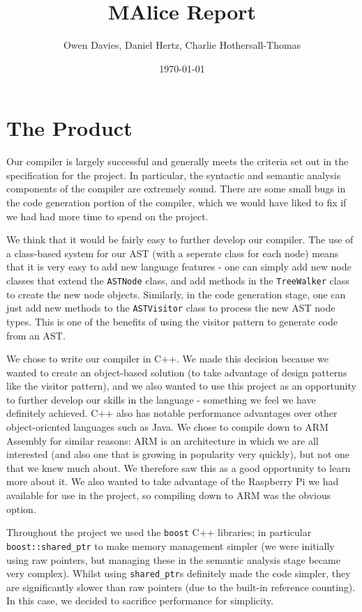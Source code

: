 \documentclass[11pt, notitlepage]{report}
\begin{document}
\title{MAlice Report}
\author{Owen Davies, Daniel Hertz, Charlie Hothersall-Thomas}
\date{\today}

\maketitle

\section*{The Product}
Our compiler is largely successful and generally meets the criteria set out in the specification for the project. In particular, the syntactic and semantic analysis components of the compiler are extremely sound. There are some small bugs in the code generation portion of the compiler, which we would have liked to fix if we had had more time to spend on the project.

We think that it would be fairly easy to further develop our compiler. The use of a class-based system for our AST (with a seperate class for each node) means that it is very easy to add new language features - one can simply add new node classes that extend the \texttt{ASTNode} class, and add methods in the \texttt{TreeWalker} class to create the new node objects. Similarly, in the code generation stage, one can just add new methods to the \texttt{ASTVisitor} class to process the new AST node types. This is one of the benefits of using the visitor pattern to generate code from an AST.

We chose to write our compiler in C++. We made this decision because we wanted to create an object-based solution (to take advantage of design patterns like the visitor pattern), and we also wanted to use this project as an opportunity to further develop our skills in the language - something we feel we have definitely achieved. C++ also has notable performance advantages over other object-oriented languages such as Java. We chose to compile down to ARM Assembly for similar reasons: ARM is an architecture in which we are all interested (and also one that is growing in popularity very quickly), but not one that we knew much about. We therefore saw this as a good opportunity to learn more about it. We also wanted to take advantage of the Raspberry Pi we had available for use in the project, so compiling down to ARM was the obvious option.

Throughout the project we used the \texttt{boost} C++ libraries; in particular \texttt{boost::shared\_ptr} to make memory management simpler (we were initially using raw pointers, but managing these in the semantic analysis stage became very complex). Whilst using \texttt{shared\_ptr}s definitely made the code simpler, they are significantly slower than raw pointers (due to the built-in reference counting). In this case, we decided to sacrifice performance for simplicity.
\end{document}
